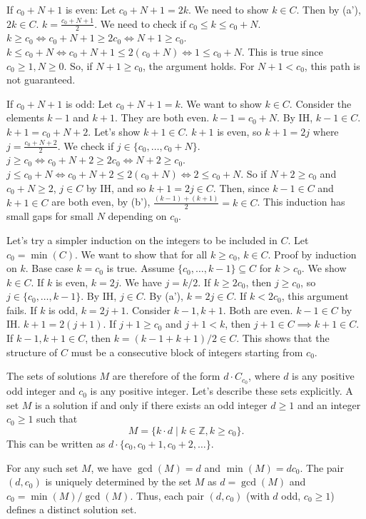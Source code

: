 \documentclass[12pt,a4paper]{article}
\theoremstyle{definition}
\begin{document}
    If $c_0+N+1$ is even: Let $c_0+N+1 = 2k$.
    We need to show $k \in C$. Then by (a'), $2k \in C$.
    $k = \frac{c_0+N+1}{2}$. We need to check if $c_0 \leq k \leq c_0+N$.
    $k \geq c_0 \iff c_0+N+1 \geq 2c_0 \iff N+1 \geq c_0$.
    $k \leq c_0+N \iff c_0+N+1 \leq 2(c_0+N) \iff 1 \leq c_0+N$. This is true since $c_0 \geq 1, N \geq 0$.
    So, if $N+1 \geq c_0$, the argument holds. For $N+1 < c_0$, this path is not guaranteed.

    If $c_0+N+1$ is odd: Let $c_0+N+1 = k$. We want to show $k \in C$.
    Consider the elements $k-1$ and $k+1$. They are both even.
    $k-1 = c_0+N$. By IH, $k-1 \in C$.
    $k+1 = c_0+N+2$. Let's show $k+1 \in C$.
    $k+1$ is even, so $k+1=2j$ where $j=\frac{c_0+N+2}{2}$.
    We check if $j \in \{c_0, \dots, c_0+N\}$.
    $j \geq c_0 \iff c_0+N+2 \geq 2c_0 \iff N+2 \geq c_0$.
    $j \leq c_0+N \iff c_0+N+2 \leq 2(c_0+N) \iff 2 \leq c_0+N$.
    So if $N+2 \geq c_0$ and $c_0+N \geq 2$, $j \in C$ by IH, and so $k+1=2j \in C$.
    Then, since $k-1 \in C$ and $k+1 \in C$ are both even, by (b'), $\frac{(k-1)+(k+1)}{2} = k \in C$.
    This induction has small gaps for small $N$ depending on $c_0$.

    Let's try a simpler induction on the integers to be included in $C$.
    Let $c_0 = \min(C)$. We want to show that for all $k \geq c_0$, $k \in C$.
    Proof by induction on $k$. Base case $k=c_0$ is true.
    Assume $\{c_0, \dots, k-1\} \subseteq C$ for $k > c_0$. We show $k \in C$.
    If $k$ is even, $k=2j$. We have $j=k/2$. If $k \geq 2c_0$, then $j \geq c_0$, so $j \in \{c_0, \dots, k-1\}$. By IH, $j \in C$. By (a'), $k=2j \in C$. If $k < 2c_0$, this argument fails.
    If $k$ is odd, $k=2j+1$. Consider $k-1, k+1$. Both are even. $k-1 \in C$ by IH.
    $k+1=2(j+1)$. If $j+1 \geq c_0$ and $j+1 < k$, then $j+1 \in C \implies k+1 \in C$.
    If $k-1,k+1 \in C$, then $k = (k-1+k+1)/2 \in C$.
    This shows that the structure of $C$ must be a consecutive block of integers starting from $c_0$.

    The sets of solutions $M$ are therefore of the form $d \cdot C_{c_0}$, where $d$ is any positive odd integer and $c_0$ is any positive integer.
    Let's describe these sets explicitly.
    A set $M$ is a solution if and only if there exists an odd integer $d \geq 1$ and an integer $c_0 \geq 1$ such that
    \[M = \{k \cdot d \mid k \in \mathbb{Z}, k \geq c_0\}.\]
    This can be written as $d \cdot \{c_0, c_0+1, c_0+2, \dots\}$.

    For any such set $M$, we have $\gcd(M)=d$ and $\min(M)=dc_0$.
    The pair $(d, c_0)$ is uniquely determined by the set $M$ as $d=\gcd(M)$ and $c_0=\min(M)/\gcd(M)$.
    Thus, each pair $(d, c_0)$ (with $d$ odd, $c_0 \geq 1$) defines a distinct solution set.
\end{document}

